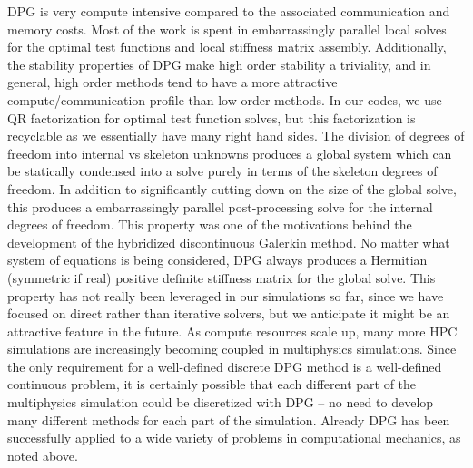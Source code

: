 \documentclass[preprint,12pt]{elsarticle}
\begin{document}
DPG is very compute intensive compared to the associated communication and memory costs.
Most of the work is spent in embarrassingly parallel local solves for the optimal test functions and local stiffness matrix assembly.
Additionally, the stability properties of DPG make high order stability a triviality, and in general, 
high order methods tend to have a more attractive compute/communication profile than low order methods.
In our codes, we use QR factorization for optimal test function solves, but this factorization is recyclable as we essentially have many right hand sides.
The division of degrees of freedom into internal vs skeleton unknowns produces a global system which can be statically condensed into 
a solve purely in terms of the skeleton degrees of freedom.
In addition to significantly cutting down on the size of the global solve, 
this produces a embarrassingly parallel post-processing solve for the internal degrees of freedom.
This property was one of the motivations behind the development of the hybridized discontinuous Galerkin\cite{HDG} method.
No matter what system of equations is being considered, DPG always produces a Hermitian (symmetric if real) 
positive definite stiffness matrix for the global solve.
This property has not really been leveraged in our simulations so far, since we have focused on direct rather than iterative solvers, but we
anticipate it might be an attractive feature in the future.
As compute resources scale up, many more HPC simulations are increasingly becoming coupled in multiphysics simulations.
Since the only requirement for a well-defined discrete DPG method is a well-defined continuous problem, it is certainly possible that each different part of the multiphysics simulation could be discretized with DPG -- no need to develop many different methods for each part of the simulation.
Already DPG has been successfully applied to a wide variety of problems in computational mechanics, as noted above.

\end{document}
